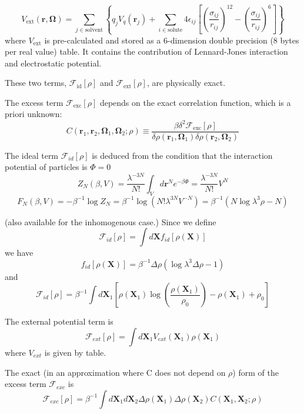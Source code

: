 \begin{equation}
V_{\mathrm{ext}}(\mathbf{r},\mathbf{\mathbf{\mathbf{\mathbf{\Omega}}}})=\sum_{j\in\mathrm{solvent}}\left\{ q_{j}V_{q}(\mathbf{r}_{j})+\sum_{i\in\mathrm{solute}}4\epsilon_{ij}\left[\left(\frac{\sigma_{ij}}{r_{ij}}\right)^{12}-\left(\frac{\sigma_{ij}}{r_{ij}}\right)^{6}\right]\right\} 
\end{equation}
where $V_{\mathrm{ext}}$ is pre-calculated and stored as a 6-dimension
double precision (8 bytes per real value) table. It contains the contribution
of Lennard-Jones interaction and electrostatic potential. 

These two terms, $\mathcal{F}_{\mathrm{id}}[\rho]$ and $\mathcal{F}_{\mathrm{ext}}[\rho]$,
are physically exact. 

The excess term $\mathcal{F}_{\mathrm{exc}}[\rho]$ depends on the
exact correlation function, which is a priori unknown: 
\begin{equation}
C(\mathbf{r}_{1},\mathbf{r}_{2},\mathbf{\Omega}_{1},\mathbf{\Omega}_{2};\rho)\equiv\frac{\beta\delta^{2}\mathcal{F}_{\mathrm{exc}}[\rho]}{\delta\rho(\mathbf{r}_{1},\mathbf{\Omega}_{1})\delta\rho(\mathbf{r}_{2},\mathbf{\Omega}_{2})}
\end{equation}


The ideal term $\mathcal{F}_{id}[\rho]$ is deduced from the condition
that the interaction potential of particles is $\Phi=0$ 
\[
Z_{N}(\beta,V)=\frac{\lambda^{-3N}}{N!}\int_{V}d\mathbf{r}^{N}e^{-\beta\Phi}=\frac{\lambda^{-3N}}{N!}V^{N}
\]
\[
F_{N}(\beta,V)=-\beta^{-1}\log{Z_{N}}=\beta^{-1}\log{(N!\lambda^{3N}V^{-N})}=\beta^{-1}(N\log{\lambda^{3}\rho}-N)
\]


(also available for the inhomogenous case.) Since we define 
\[
\mathcal{F}_{id}[\rho]=\int d\mathbf{X}f_{id}[\rho(\mathbf{X})]
\]
we have 
\[
f_{id}[\rho(\mathbf{X})]=\beta^{-1}\Delta\rho(\log{\lambda^{3}\Delta\rho}-1)
\]
and 
\[
\mathcal{F}_{id}[\rho]=\beta^{-1}\int d\mathbf{X}_{1}[\rho(\mathbf{X}_{1})\log{(\frac{\rho(\mathbf{X}_{1})}{\rho_{0}})}-\rho(\mathbf{X}_{1})+\rho_{0}]
\]


The external potential term is
\[
\mathcal{F}_{ext}[\rho]=\int d\mathbf{X}_{1}V_{ext}(\mathbf{X}_{1})\rho(\mathbf{X}_{1})
\]
where $V_{ext}$ is given by table.

The exact (in an approximation where C does not depend on $\rho$) form
of the excess term $\mathcal{F}_{exc}$ is 
\[
\mathcal{F}_{exc}[\rho]=\beta^{-1}\int d\mathbf{X}_{1}d\mathbf{X}_{2}\Delta\rho(\mathbf{X}_{1})\Delta\rho(\mathbf{X}_{2})C(\mathbf{X}_{1},\mathbf{X}_{2};\rho)
\]


